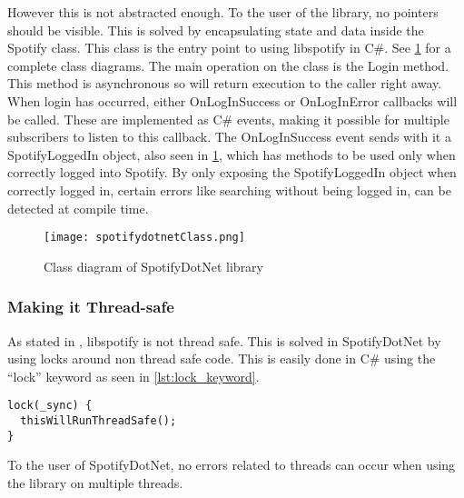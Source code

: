 However this is not abstracted enough. To the user of the library, no pointers should be visible. This is solved by encapsulating state and data inside the Spotify class. This class is the entry point to using libspotify in C\#. See \cref{fig:spotifydotnet_class} for a complete class diagrams. The main operation on the class is the Login method. This method is asynchronous so will return execution to the caller right away. When login has occurred, either OnLogInSuccess or OnLogInError callbacks will be called. These are implemented as C\# events, making it possible for multiple subscribers to listen to this callback. The OnLogInSuccess event sends with it a SpotifyLoggedIn object, also seen in \cref{fig:spotifydotnet_class}, which has methods to be used only when correctly logged into Spotify. By only exposing the SpotifyLoggedIn object when correctly logged in, certain errors like searching without being logged in, can be detected at compile time.

\begin{figure}
  \centering
  \texttt{[image: spotifydotnetClass.png]}
  \caption{Class diagram of SpotifyDotNet library}
  \label{fig:spotifydotnet_class}
\end{figure}

\subsubsection{Making it Thread-safe}
\label{ssub:making_it_thread_safe}

As stated in \cite{spotifyLibspotifyFAQ}, libspotify is not thread safe. This is solved in SpotifyDotNet by using locks around non thread safe code. This is easily done in C\# using the \enquote{lock} keyword as seen in \cref{lst:lock_keyword}.

\begin{lstlisting}[caption = {Example of using the lock keyword in C\#. \enquote{\_sync} is an object used to store the lock state}, label = {lst:lock_keyword}]
lock(_sync) {
  thisWillRunThreadSafe();
}
\end{lstlisting}

To the user of SpotifyDotNet, no errors related to threads can occur when using the library on multiple threads.
